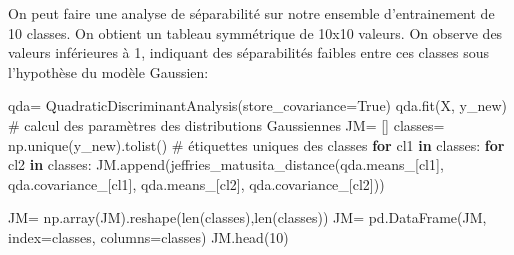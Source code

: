 \documentclass[
  french,
  11pt,
  letterpaper,
  open=any,
  twoside=false,
  french]{scrbook}
\newenvironment{Shaded}{\begin{snugshade}}{\end{snugshade}}
\newcommand{\BuiltInTok}[1]{\textcolor[rgb]{0.00,0.23,0.31}{#1}}
\newcommand{\CommentTok}[1]{\textcolor[rgb]{0.37,0.37,0.37}{#1}}
\newcommand{\ControlFlowTok}[1]{\textcolor[rgb]{0.00,0.23,0.31}{\textbf{#1}}}
\newcommand{\DecValTok}[1]{\textcolor[rgb]{0.68,0.00,0.00}{#1}}
\newcommand{\KeywordTok}[1]{\textcolor[rgb]{0.00,0.23,0.31}{\textbf{#1}}}
\newcommand{\NormalTok}[1]{\textcolor[rgb]{0.00,0.23,0.31}{#1}}
\newcommand{\OperatorTok}[1]{\textcolor[rgb]{0.37,0.37,0.37}{#1}}
\newcommand{\VariableTok}[1]{\textcolor[rgb]{0.07,0.07,0.07}{#1}}
\begin{document}
On peut faire une analyse de séparabilité sur notre ensemble
d'entrainement de 10 classes. On obtient un tableau symmétrique de 10x10
valeurs. On observe des valeurs inférieures à 1, indiquant des
séparabilités faibles entre ces classes sous l'hypothèse du modèle
Gaussien:

\begin{Shaded}
\begin{Highlighting}[]
\NormalTok{qda}\OperatorTok{=}\NormalTok{ QuadraticDiscriminantAnalysis(store\_covariance}\OperatorTok{=}\VariableTok{True}\NormalTok{)}
\NormalTok{qda.fit(X, y\_new) }\CommentTok{\# calcul des paramètres des distributions Gaussiennes}
\NormalTok{JM}\OperatorTok{=}\NormalTok{ []}
\NormalTok{classes}\OperatorTok{=}\NormalTok{ np.unique(y\_new).tolist() }\CommentTok{\# étiquettes uniques des classes}
\ControlFlowTok{for}\NormalTok{ cl1 }\KeywordTok{in}\NormalTok{ classes:}
  \ControlFlowTok{for}\NormalTok{ cl2 }\KeywordTok{in}\NormalTok{ classes:}
\NormalTok{    JM.append(jeffries\_matusita\_distance(qda.means\_[cl1], qda.covariance\_[cl1], qda.means\_[cl2], qda.covariance\_[cl2]))}

\NormalTok{JM}\OperatorTok{=}\NormalTok{ np.array(JM).reshape(}\BuiltInTok{len}\NormalTok{(classes),}\BuiltInTok{len}\NormalTok{(classes))}
\NormalTok{JM}\OperatorTok{=}\NormalTok{ pd.DataFrame(JM, index}\OperatorTok{=}\NormalTok{classes, columns}\OperatorTok{=}\NormalTok{classes)}
\NormalTok{JM.head(}\DecValTok{10}\NormalTok{)}
\end{Highlighting}
\end{Shaded}
\end{document}
